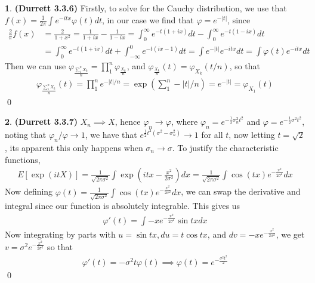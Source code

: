 \documentclass{article}
\theoremstyle{definition}
\newtheorem{pb}{}
\newcommand{\abs}[1]{\left\vert#1\right\vert}
\begin{document}
    \begin{pb}\textbf{(Durrett 3.3.6)}
        Firstly, to solve for the Cauchy distribution, we use that \(f(x) = \frac{1}{2\pi}\int e^{-itx}\varphi(t)dt\), in our case we find that \(\varphi = e^{-\abs{t}}\), since
        \begin{align*}
            \frac{2}{\pi}f(x) &= \frac{2}{1+x^2} = \frac{1}{1+ix} - \frac{1}{1-ix} = \int_0^\infty e^{-t(1+ix)}dt - \int_0^\infty e^{-t(1-ix)}dt \\
            &= \int_0^\infty e^{-t(1+ix)}dt + \int_{-\infty}^0 e^{-t(ix - 1)}dt = \int e^{-\abs{t}}e^{-itx}dt = \int \varphi(t)e^{-itx}dt
        \end{align*}
        Then we can use \(\varphi_{\frac{\sum_1^n X_k}{n}} = \prod_1^n \varphi_{\frac{X_k}{n}}\), and \(\varphi_{\frac{X_k}{n}}(t) = \varphi_{X_k}(t/n)\), so that
        \begin{align*}
            \varphi_{\frac{\sum_1^n X_k}{n}}(t) = \prod_1^n e^{-\abs{t}/n} = \exp\left(\sum_1^n-\abs{t}/n \right)= e^{-\abs{t}} = \varphi_{X_1}(t)
        \end{align*} \qed
    \end{pb}
    \begin{pb}\textbf{(Durrett 3.3.7)}
        \(X_n \implies X\), hence \(\varphi_n \to \varphi\), where \(\varphi_n = e^{-\frac12 \sigma_n^2t^2}\) and \(\varphi = e^{-\frac12 \sigma^2t^2}\), noting that \(\varphi_n/\varphi \to 1\), we have that \(e^{\frac12 t^2 (\sigma^2 - \sigma_n^2)} \to 1\) for all \(t\), now letting \(t = \sqrt{2}\), its apparent this only happens when \(\sigma_n \to \sigma\). To justify the characteristic functions,
        \begin{align*}
            E[\exp(itX)] = \frac{1}{\sqrt{2\pi \sigma^2}}\int \exp(itx - \frac{x^2}{2\sigma^2})dx = \frac{1}{\sqrt{2\pi \sigma^2}}\int \cos(tx)e^{-\frac{x^2}{2 \sigma^2}}dx
        \end{align*}
        Now defining \(\varphi(t) = \frac{1}{\sqrt{2\pi \sigma^2}}\int \cos(tx)e^{-\frac{x^2}{2 \sigma^2}}dx\), we can swap the derivative and integral since our function is absolutely integrable. This gives us
        \begin{align*}
            \varphi'(t) = \int -xe^{-\frac{x^2}{2 \sigma^2}}\sin tx dx
        \end{align*}
        Now integrating by parts with \(u = \sin tx, du = t\cos tx\), and \(dv = -xe^{-\frac{x^2}{2 \sigma^2}}\), we get \(v = \sigma^2 e^{-\frac{x^2}{2 \sigma^2}}\) so that
        \begin{align*}
            \varphi'(t) = - \sigma^2t \varphi(t) \implies \varphi(t) = e^{- \frac{\sigma^2 t^2}{2}}
        \end{align*} \qed
    \end{pb}
\end{document}
